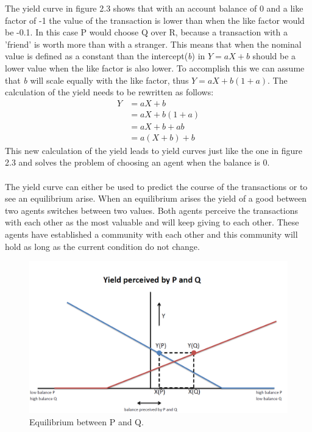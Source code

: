 \documentclass[twoside,openright]{uva-bachelor-thesis}
\begin{document}
The yield curve in figure 2.3 shows that with an account balance of 0 and a like factor of -1 the value of the transaction is lower than when the like factor would be -0.1. In this case P would choose Q over R, because a transaction with a 'friend' is worth more than with a stranger. This means that when the nominal value is defined as a constant than the intercept(\textit{b}) in \textit{$Y = aX + b$} should be a lower value when the like factor is also lower. To accomplish this we can assume that \textit{b} will scale equally with the like factor, thus \textit{$Y = aX + b(1 + a)$}.  The calculation of the yield needs to be rewritten as follows:
\begin{equation}
\begin{split}
  Y & = aX + b \\
     & = aX + b(1 + a) \\
     & = aX + b + ab \\
     & = a(X + b) + b 
\end{split}
\end{equation}
This new calculation of the yield leads to yield curves just like the one in figure 2.3 and solves the problem of choosing an agent when the balance is 0.
\\
\\
The yield curve can either be used to predict the course of the transactions or to see an equilibrium arise. When an equilibrium arises the yield of a good between two agents switches between two values.  Both agents perceive the transactions with each other as the most valuable and will keep giving to each other. These agents have established a community with each other and this community will hold as long as the current condition do not change. 
\begin{figure}[h!]
 
  \centering
    \includegraphics[scale=0.4]{YieldCurves/yieldcurve_PQ_equilibrium}
 \caption{Equilibrium between P and Q.}
\end{figure}
\end{document}
